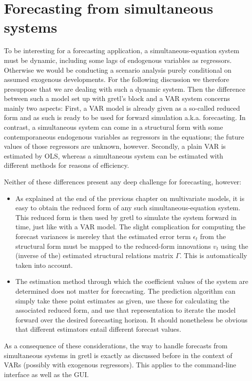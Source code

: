 \section{Forecasting from simultaneous systems}
\label{sec:fcast-system}

To be interesting for a forecasting application, a simultaneous-equation
system must be dynamic, including some lags of endogenous variables as
regressors. Otherwise we would be conducting a scenario analysis purely 
conditional on assumed exogenous developments. For the following 
discussion we therefore presuppose that we are dealing with such a
dynamic system. Then the difference between such a model set up with
gretl's  block and a VAR system concerns mainly two aspects:
First, a VAR model is already given as a so-called reduced form and as
such is ready to be used for forward simulation a.k.a. forecasting. In 
contrast, a simultaneous system can come in a structural form with some 
contemporaneous endogenous variables as regressors in the equations; the
 future values of those
regressors are unknown, however. Secondly, a plain VAR is estimated by
OLS, whereas a simultaneous system can be estimated with different 
methods for reasons of efficiency.

Neither of these differences present any deep challenge for forecasting,
however:

\begin{itemize}
\item As explained at the end of the previous chapter on multivariate 
models, it is easy to obtain the reduced form of any such 
simultaneous-equation system. This reduced form is then used by gretl to
simulate the system forward in time, just like with a VAR model. The
slight complication for computing the forecast variances is mereley that
the estimated error term $\epsilon_t$ from the structural form
must be mapped to the reduced-form innovations $v_t$ using the (inverse 
of the) estimated structural relations matrix $\Gamma$. This is
automatically taken into account.

\item The estimation method through which the coefficient values of the
system are determined does not matter for forecasting. The prediction
algorithm can simply take these point estimates as given, use these for 
calculating the associated reduced form, and use that representation to 
iterate the model forward over the desired forecasting horizon. It
should nonetheless be obvious that different estimators entail different
forecast values. 
  
\end{itemize} 

As a consequence of these considerations, the way to handle forecasts
from simultaneous systems in gretl is exactly as discussed before in the
context of VARs (possibly with exogenous regressors). This applies
to the command-line interface as well as the GUI.


    
